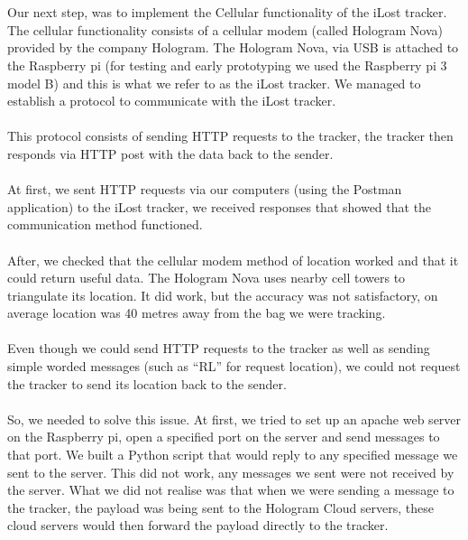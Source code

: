 \documentclass[12pt,a4paper]{article}
\begin{document}
        
        \paragraph{} Our next step, was to implement the Cellular functionality of the iLost tracker. The cellular functionality consists of a cellular modem (called Hologram Nova) provided by the company Hologram. The Hologram Nova, via USB is attached to the Raspberry pi (for testing and early prototyping we used the Raspberry pi 3 model B) and this is what we refer to as the iLost tracker. We managed to establish a protocol to communicate with the iLost tracker.
        
        \paragraph{} This protocol consists of sending HTTP requests to the tracker, the tracker then responds via HTTP post with the data back to the sender.   
        
        \paragraph{} At first, we sent HTTP requests via our computers (using the Postman application) to the iLost tracker, we received responses that showed that the communication method functioned. 
        
        \paragraph{} After, we checked that the cellular modem method of location worked and that it could return useful data. The Hologram Nova uses nearby cell towers to triangulate its location. It did work, but the accuracy was not satisfactory, on average location was 40 metres away from the bag we were tracking.
        
        \paragraph{} Even though we could send HTTP requests to the tracker as well as sending simple worded messages (such as “RL” for request location), we could not request the tracker to send its location back to the sender.
        
        \paragraph{} So, we needed to solve this issue. At first, we tried to set up an apache web server on the Raspberry pi, open a specified port on the server and send messages to that port. We built a Python script that would reply to any specified message we sent to the server. This did not work, any messages we sent were not received by the server. What we did not realise was that when we were sending a message to the tracker, the payload was being sent to the Hologram Cloud servers, these cloud servers would then forward the payload directly to the tracker.
        
\end{document}
